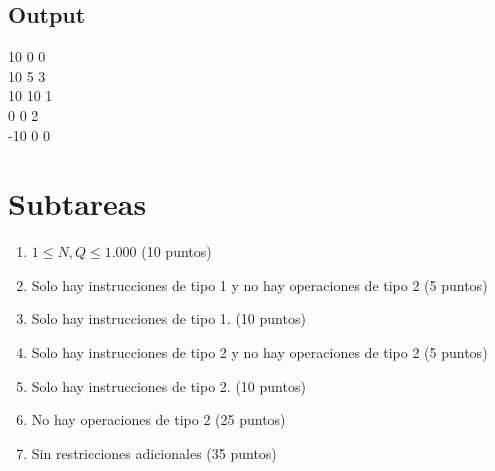 \documentclass{article}
\begin{document}
\subsection{Output}
10 0 0\\
10 5 3\\
10 10 1\\
0 0 2\\
-10 0 0
\section{Subtareas}
\begin{enumerate}
    \item $1 \leq N,Q \leq 1.000$ (10 puntos)
    \item Solo hay instrucciones de tipo 1 y no hay operaciones de tipo 2 (5 puntos)
    \item Solo hay instrucciones de tipo 1. (10 puntos)
    \item Solo hay instrucciones de tipo 2 y no hay operaciones de tipo 2 (5 puntos)
    \item Solo hay instrucciones de tipo 2. (10 puntos)
    \item No hay operaciones de tipo 2 (25 puntos)
    \item Sin restricciones adicionales (35 puntos)
\end{enumerate}
\end{document}
